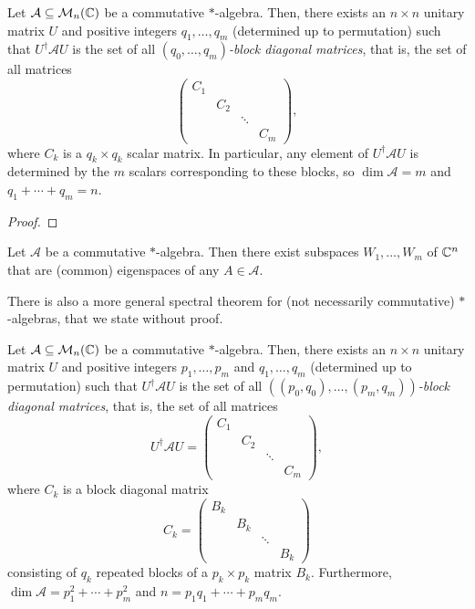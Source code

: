 	\begin{ftheo}
		Let $\mathcal{A} \subseteq \mathcal{M}_n(\mathbb{C})$ be a commutative $*$-algebra. Then, there exists an $n \times n$ unitary matrix $U$ and positive integers $q_1,\ldots,q_m$ (determined up to permutation) such that $U^\dagger \mathcal{A} U$ is the set of all \emph{$(q_0,\ldots,q_m)$-block diagonal matrices}, that is, the set of all matrices
		\[ \begin{pmatrix} C_1 & & & \\ & C_2 & & \\ & & \ddots & \\ & & & C_m \end{pmatrix}, \]
		where $C_k$ is a $q_k \times q_k$ scalar matrix. In particular, any element of $U^\dagger \mathcal{A} U$ is determined by the $m$ scalars corresponding to these blocks, so $\dim \mathcal{A} = m$ and $q_1 + \cdots + q_m = n$.
	\end{ftheo}
	\begin{proof}
		
	\end{proof}

	\begin{corollary}
		Let $\mathcal{A}$ be a commutative $*$-algebra. Then there exist subspaces $W_1,\ldots,W_m$ of $\mathbb{C}^n$ that are (common) eigenspaces of any $A \in \mathcal{A}$.
	\end{corollary}

	There is also a more general spectral theorem for (not necessarily commutative) $*$-algebras, that we state without proof.

	\begin{ftheo}
		Let $\mathcal{A} \subseteq \mathcal{M}_n(\mathbb{C})$ be a commutative $*$-algebra. Then, there exists an $n \times n$ unitary matrix $U$ and positive integers $p_1,\ldots,p_m$ and $q_1,\ldots,q_m$ (determined up to permutation) such that $U^\dagger \mathcal{A} U$ is the set of all \emph{$((p_0,q_0),\ldots,(p_m,q_m))$-block diagonal matrices}, that is, the set of all matrices
		\[ U^\dagger \mathcal{A} U = \begin{pmatrix} C_1 & & & \\ & C_2 & & \\ & & \ddots & \\ & & & C_m \end{pmatrix}, \]
		where $C_k$ is a block diagonal matrix
		\[ C_k = \begin{pmatrix} B_k & & & \\ & B_k & & \\ & & \ddots & \\ & & & B_k \end{pmatrix} \]
		consisting of $q_k$ repeated blocks of a $p_k \times p_k$ matrix $B_k$.	
		Furthermore, $\dim \mathcal{A} = p_1^2 + \cdots + p_m^2$ and $n = p_1q_1 + \cdots + p_mq_m$.
	\end{ftheo}

